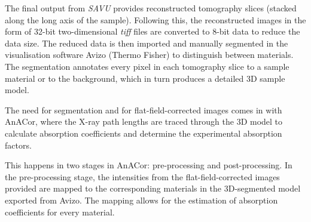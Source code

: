 The final output from \textit{SAVU} provides reconstructed tomography slices (stacked along the long axis of the sample). Following this, the reconstructed images in the form of 32-bit two-dimensional \textit{tiff} files are converted to 8-bit data to reduce the data size. The reduced data is then imported and manually segmented in the visualisation software Avizo (Thermo Fisher) to distinguish between materials. The segmentation annotates every pixel in each tomography slice to a sample material or to the background, which in turn produces a detailed 3D sample model.


The need for segmentation and for flat-field-corrected images comes in with AnACor, where the X-ray path lengths are traced through the 3D model to calculate absorption coefficients and determine the experimental absorption factors.

This happens in two stages in AnACor: pre-processing and post-processing. In the pre-processing stage, the intensities from the flat-field-corrected images provided are mapped to the corresponding materials in the 3D-segmented model exported from Avizo. The mapping allows for the estimation of absorption coefficients for every material.%


